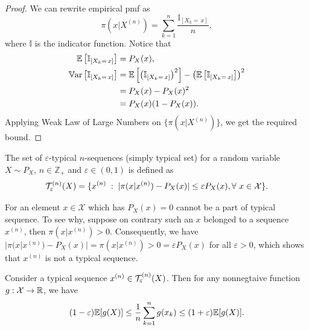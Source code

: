 \documentclass[11pt,a4paper]{article}
\begin{document}
\begin{proof}
    We can rewrite empirical pmf as 
    \begin{equation*}
        \pi(x|X^{(n)}) = \sum_{k=1}^{n} \dfrac{\mathbb{I}_{[X_k =\, x]}}{n}, 
    \end{equation*}
    where $\mathbb{I}$ is the indicator function. Notice that
    \begin{align*}
        \mathbb{E}\left[\mathbb{I}_{[X_k =\, x]}\right] &= P_X(x), \\
        \mathbb{V}\text{ar}\left[ \mathbb{I}_{[X_k =\, x]} \right] &= \mathbb{E}\left[\left( \mathbb{I}_{[X_k =\, x]} \right)^2\right] - \left(\mathbb{E}\left[\mathbb{I}_{[X_k =\, x]}\right]\right)^2 \\
        &= P_X(x) - P_X(x)^2 \\ 
        &= P_X(x)(1-P_X(x)).
    \end{align*}
    Applying Weak Law of Large Numbers on $\{\pi(x|X^{(n)})\}$, we get the required bound.
\end{proof}

\begin{definition}
    The {set of $\varepsilon$-typical $n$-sequences} (simply typical set) for a random variable $X\sim P_X$, $n\in\mathbb{Z}_+$ and $\varepsilon \in (0,1)$ is defined as
    \begin{equation*}
        \mathcal{T}^{(n)}_\varepsilon (X) = \{x^{(n)}\;:\; |\pi(x|x^{(n)}) - P_X(x)| \le \varepsilon P_X(x), \forall\ x\in\mathcal{X}\}.
    \end{equation*}
\end{definition}

\begin{remark}
    For an element $x\in\mathcal{X}$ which has $P_X(x) = 0$ cannot be a part of typical sequence. To see why, suppose on contrary such an $x$ belonged to a sequence $x^{(n)}$, then $\pi(x|x^{(n)}) > 0$. Consequently, we have $|\pi(x|x^{(n)}) - P_X(x)| = \pi(x|x^{(n)}) > 0 = \varepsilon P_X(x)$ for all $\varepsilon > 0$, which shows that $x^{(n)}$ is not a typical sequence.
\end{remark}

\begin{lemma}
    Consider a typical sequence $x^{(n)}\in \mathcal{T}^{(n)}_\varepsilon (X)$. Then for any {nonnegtaive} function $g:\mathcal{X}\rightarrow \mathbb{R}$, we have 
    \begin{equation*}
        (1-\varepsilon) \mathbb{E}[g(X)] \le \dfrac{1}{n} \sum_{k=1}^{n} g(x_k) \le (1+\varepsilon) \mathbb{E}[g(X)].
    \end{equation*}
\end{lemma}
\end{document}
